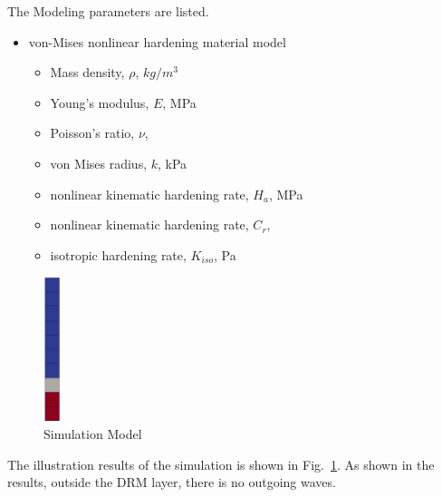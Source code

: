 The Modeling parameters are listed.
\begin{itemize}
  \item von-Mises nonlinear hardening material model 
  \begin{itemize}
    \item Mass density, $\rho$, \enspace {} $kg/m^3$
    \item Young's modulus, $E$, \enspace {} MPa
    \item Poisson's ratio, $\nu$, \enspace {}
    \item von Mises radius, $k$, \enspace {} kPa
    \item nonlinear kinematic hardening rate, $H_a$, \enspace {} MPa
    \item nonlinear kinematic hardening rate, $C_r$, \enspace {}
    \item isotropic hardening rate, $K_{iso}$, \enspace {} Pa
  \end{itemize}
\end{itemize}





\begin{figure}[H]
  \centering
  \includegraphics[width = 0.5cm]{./Figure-files/nonlinear_analysis_steps/free_field_1D/overview.png}
  \caption{Simulation Model}
  \label{fig_decon_1D_motion_1D_model}
\end{figure}

The illustration results of the simulation is shown in Fig.~\ref{fig_decon_1D_motion_1D_model}.
As shown in the results, outside the DRM layer, there is no outgoing waves. 

